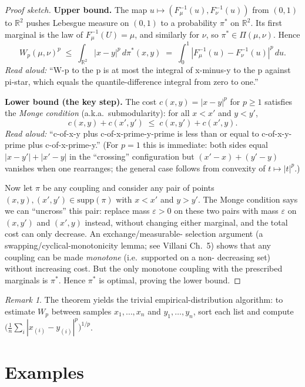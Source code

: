 \documentclass[11pt]{article}
\theoremstyle{definition}
\theoremstyle{remark}
\newtheorem*{remark}{Remark}
\begin{document}
\begin{proof}[Proof sketch]
\textbf{Upper bound.}  The map $u \mapsto (F_\mu^{-1}(u), F_\nu^{-1}(u))$ from
$(0,1)$ to $\mathbb{R}^2$ pushes Lebesgue measure on $(0,1)$ to a probability $\pi^*$ on
$\mathbb{R}^2$.  Its first marginal is the law of $F_\mu^{-1}(U) = \mu$, and similarly
for $\nu$, so $\pi^* \in \Pi(\mu, \nu)$.  Hence
\[
W_p(\mu, \nu)^p \;\leq\; \int_{\mathbb{R}^2} |x-y|^p \, d\pi^*(x,y)
                  \;=\; \int_0^1 |F_\mu^{-1}(u) - F_\nu^{-1}(u)|^p \, du.
\]
\emph{Read aloud:} ``W-p to the p is at most the integral of x-minus-y to the p against pi-star, which equals the quantile-difference integral from zero to one.''

\textbf{Lower bound (the key step).}  The cost $c(x,y) = |x-y|^p$ for $p \geq 1$
satisfies the \emph{Monge condition} (a.k.a.\ submodularity):
for all $x < x'$ and $y < y'$,
\[
c(x, y) + c(x', y') \;\leq\; c(x, y') + c(x', y).
\]
\emph{Read aloud:} ``c-of-x-y plus c-of-x-prime-y-prime is less than or equal to c-of-x-y-prime plus c-of-x-prime-y.''
(For $p = 1$ this is immediate: both sides equal $|x - y'| + |x' - y|$ in the
``crossing'' configuration but $(x'-x) + (y'-y)$ vanishes when one rearranges; the
general case follows from convexity of $t \mapsto |t|^p$.)

Now let $\pi$ be any coupling and consider any pair of points
$(x, y), (x', y') \in \mathrm{supp}(\pi)$ with $x < x'$ and $y > y'$.  The Monge
condition says we can ``uncross'' this pair: replace mass $\varepsilon > 0$ on these
two pairs with mass $\varepsilon$ on $(x, y')$ and $(x', y)$ instead, without changing
either marginal, and the total cost can only decrease.  An exchange/measurable-
selection argument (a swapping/cyclical-monotonicity lemma; see Villani Ch.~5)
shows that any coupling can be made \emph{monotone} (i.e.\ supported on a non-
decreasing set) without increasing cost.  But the only monotone coupling with the
prescribed marginals is $\pi^*$.  Hence $\pi^*$ is optimal, proving the lower
bound.
\end{proof}

\begin{remark}
The theorem yields the trivial empirical-distribution algorithm: to estimate
$W_p$ between samples $x_1, \ldots, x_n$ and $y_1, \ldots, y_n$, sort each list
and compute $\bigl( \tfrac{1}{n} \sum_i |x_{(i)} - y_{(i)}|^p \bigr)^{1/p}$.
\end{remark}

\section*{Examples}
\end{document}
